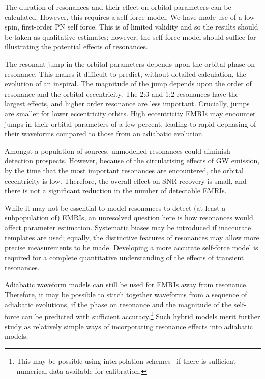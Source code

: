 \documentclass[aps,prd,amsfonts,amssymb,amsmath,nofootinbib,showpacs,superscriptaddress,twocolumn,floatfix]{revtex4-1}
\begin{document}
The duration of resonances and their effect on orbital parameters can be calculated. However, this requires a self-force model. We have made use of a low spin, first-order PN self force. This is of limited validity and so the results should be taken as qualitative estimates; however, the self-force model should suffice for illustrating the potential effects of resonances.

The resonant jump in the orbital parameters depends upon the orbital phase on resonance. This makes it difficult to predict, without detailed calculation, the evolution of an inspiral. The magnitude of the jump depends upon the order of resonance and the orbital eccentricity. The $2$:$3$ and $1$:$2$ resonances have the largest effects, and higher order resonance are less important. Crucially, jumps are smaller for lower eccentricity orbits. High eccentricity EMRIs may encounter jumps in their orbital parameters of a few percent, leading to rapid dephasing of their waveforms compared to those from an adiabatic evolution.

Amongst a population of sources, unmodelled resonances could diminish detection prospects. However, because of the circularising effects of GW emission, by the time that the most important resonances are encountered, the orbital eccentricity is low. Therefore, the overall effect on SNR recovery is small, and there is not a significant reduction in the number of detectable EMRIs.

While it may not be essential to model resonances to detect (at least a subpopulation of) EMRIs, an unresolved question here is how resonances would affect parameter estimation. Systematic biases may be introduced if inaccurate templates are used; equally, the distinctive features of resonances may allow more precise measurements to be made. Developing a more accurate self-force model is required for a complete quantitative understanding of the effects of transient resonances.

Adiabatic waveform models can still be used for EMRIs away from resonance. Therefore, it may be possible to stitch together waveforms from a sequence of adiabatic evolutions, if the phase on resonance and the magnitude of the self-force can be predicted with sufficient accuracy.\footnote{This may be possible using interpolation schemes~\cite{Warburton2012} if there is sufficient numerical data available for calibration.} Such hybrid models merit further study as relatively simple ways of incorporating resonance effects into adiabatic models.
\end{document}
